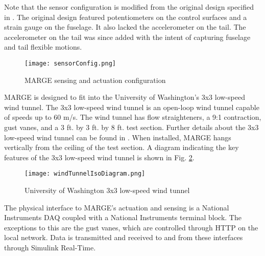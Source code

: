 Note that the sensor configuration is modified from the original design specified in \cite{Quenzer2019}. The original design featured potentiometers on the control surfaces and a strain gauge on the fuselage. It also lacked the accelerometer on the tail. The accelerometer on the tail was since added with the intent of capturing fuselage and tail flexible motions.
\begin{figure}[h]
    \centering
    \texttt{[image: sensorConfig.png]}
    \caption{MARGE sensing and actuation configuration}
    \label{fig:sensorConfig}
\end{figure}

MARGE is designed to fit into the University of Washington's 3x3 low-speed wind tunnel. The 3x3 low-speed wind tunnel is an open-loop wind tunnel capable of speeds up to 60 m/s. The wind tunnel has flow straighteners, a 9:1 contraction, gust vanes, and a 3 ft. by 3 ft. by 8 ft. test section. Further details about the 3x3 low-speed wind tunnel can be found in \cite{3x3site}. When installed, MARGE hangs vertically from the ceiling of the test section. A diagram indicating the key features of the 3x3 low-speed wind tunnel is shown in Fig. \ref{fig:3x3}.
\begin{figure}[h]
    \centering
    \texttt{[image: windTunnelIsoDiagram.png]}
    \caption{University of Washington 3x3 low-speed wind tunnel}
    \label{fig:3x3}
\end{figure}

The physical interface to MARGE's actuation and sensing is a National Instruments DAQ coupled with a National Instruments terminal block. The exceptions to this are the gust vanes, which are controlled through HTTP on the local network. Data is transmitted and received to and from these interfaces through Simulink Real-Time.